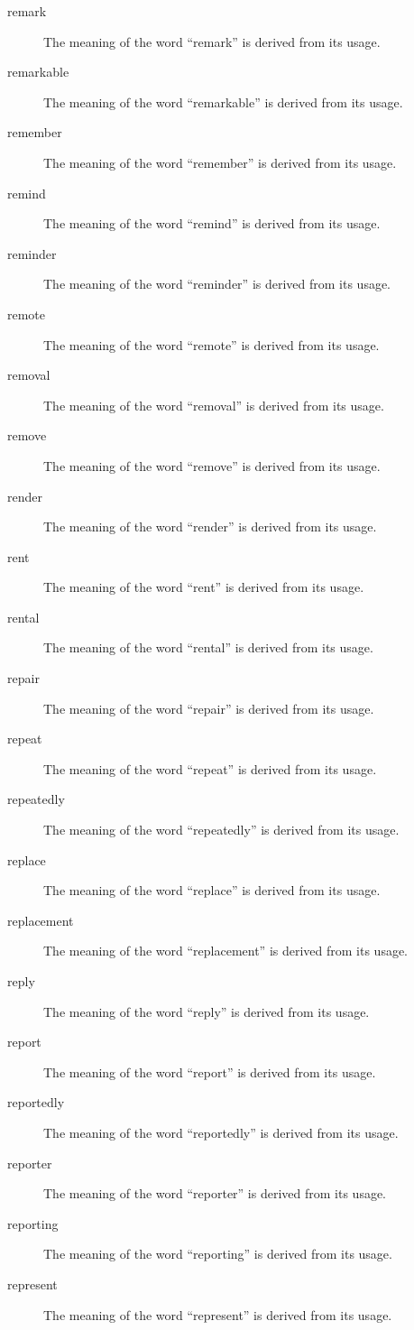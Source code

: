 \documentclass[12pt, letterpaper]{memoir}
\begin{document}
\begin{description}
\item[remark] The meaning of the word ``remark'' is derived from its usage.
\item[remarkable] The meaning of the word ``remarkable'' is derived from its usage.
\item[remember] The meaning of the word ``remember'' is derived from its usage.
\item[remind] The meaning of the word ``remind'' is derived from its usage.
\item[reminder] The meaning of the word ``reminder'' is derived from its usage.
\item[remote] The meaning of the word ``remote'' is derived from its usage.
\item[removal] The meaning of the word ``removal'' is derived from its usage.
\item[remove] The meaning of the word ``remove'' is derived from its usage.
\item[render] The meaning of the word ``render'' is derived from its usage.
\item[rent] The meaning of the word ``rent'' is derived from its usage.
\item[rental] The meaning of the word ``rental'' is derived from its usage.
\item[repair] The meaning of the word ``repair'' is derived from its usage.
\item[repeat] The meaning of the word ``repeat'' is derived from its usage.
\item[repeatedly] The meaning of the word ``repeatedly'' is derived from its usage.
\item[replace] The meaning of the word ``replace'' is derived from its usage.
\item[replacement] The meaning of the word ``replacement'' is derived from its usage.
\item[reply] The meaning of the word ``reply'' is derived from its usage.
\item[report] The meaning of the word ``report'' is derived from its usage.
\item[reportedly] The meaning of the word ``reportedly'' is derived from its usage.
\item[reporter] The meaning of the word ``reporter'' is derived from its usage.
\item[reporting] The meaning of the word ``reporting'' is derived from its usage.
\item[represent] The meaning of the word ``represent'' is derived from its usage.

\end{description}
\end{document}
